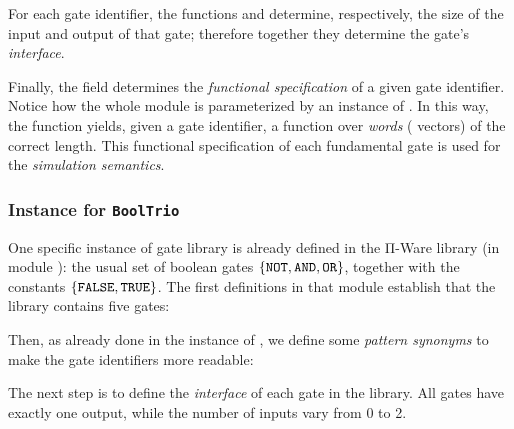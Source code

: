             For each gate identifier, the functions  and  determine, respectively,
            the size of the input and output of that gate; therefore together they determine the gate's \emph{interface}.

            Finally, the  field determines the \emph{functional specification} of a given gate identifier.
            Notice how the whole  module is parameterized by an instance of .
            In this way, the  function yields, given a gate identifier, a function over \emph{words}
            ( vectors) of the correct length.
            This functional specification of each fundamental gate is used for the \emph{simulation semantics}.

            \subsubsection{Instance for \texttt{BoolTrio}}
            \label{subsubsec:gates-booltrio}
            One specific instance of gate library is already defined in the Π-Ware library
            (in module ): the usual set of boolean gates
            $\{ \text{\texttt{NOT}}, \text{\texttt{AND}}, \text{\texttt{OR}} \}$,
            together with the constants $\{ \text{\texttt{FALSE}}, \text{\texttt{TRUE}} \}$.
            The first definitions in that module establish that the library contains five gates:

            \begin{center}
            \end{center}

            Then, as already done in the instance of , we define some \emph{pattern synonyms}
            to make the gate identifiers more readable:

            \begin{center}
            \end{center}

            The next step is to define the \emph{interface} of each gate in the library.
            All gates have exactly one output, while the number of inputs vary from 0 to 2.

            \begin{center}
            \end{center}

